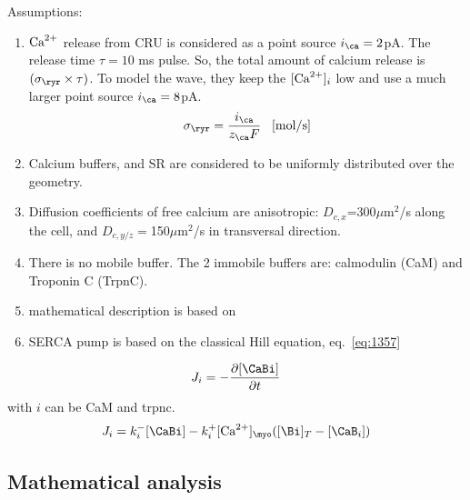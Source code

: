Assumptions:
\begin{enumerate}
\item ${\text{Ca}^{2+}}$ release from CRU is considered as a point source
  $i_\ca=2$pA. The release time $\tau=10$ ms pulse. So, the total
  amount of calcium release is $(\sigma_\ryr\times\tau)$. To model the
  wave, they keep the $[{\text{Ca}^{2+}}]_i$ low and use a much larger point source
  $i_\ca=8$pA. 
  \begin{equation}
    \label{eq:1359}
    \sigma_\ryr = \frac{i_\ca}{z_\ca F} \;\;\; \text{[mol/s]}
  \end{equation}

\item Calcium buffers, and SR are considered to be uniformly
  distributed over the geometry.

\item Diffusion coefficients of free calcium are anisotropic:
  $D_{c,x}$=300$\mu$m$^2$/s along the cell, and $D_{c,y/z}=$150$\mu$m$^2$/s in
  transversal direction.

\item There is no mobile buffer. The 2 immobile buffers are:
  calmodulin (CaM) and Troponin C (TrpnC).

\item mathematical description is based on~\citep{izu2001}


\item SERCA pump is based on the classical Hill equation,
  eq.~\eqref{eq:1357}
\end{enumerate}
\begin{equation}
  \label{eq:1361}
  J_i = -\frac{\partial [\CaBi]}{\partial t}
\end{equation}
with $i$ can be CaM and trpnc. 
\begin{equation}
  \label{eq:1363}
  J_i = k^-_i[\CaBi] - k^+_i[\Ca]_\myo([\Bi]_T - [\CaB_i])
\end{equation}

\subsection{Mathematical analysis}
\label{sec:math-analys-3}

